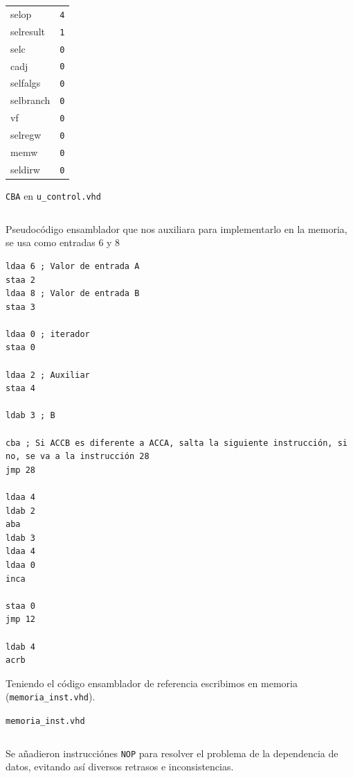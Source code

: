 \documentclass{IEEEtran}
\newenvironment{code}{\captionsetup{type=listing}}{}
\begin{document}
\begin{itemize}
\begin{table}[htbp]
\begin{tabular}{ll}
selop & \texttt{4}\\
selresult & \texttt{1}\\
selc & \texttt{0}\\
cadj & \texttt{0}\\
selfalgs & \texttt{0}\\
selbranch & \texttt{0}\\
vf & \texttt{0}\\
selregw & \texttt{0}\\
memw & \texttt{0}\\
seldirw & \texttt{0}\\
\hline
\end{tabular}
\end{table}
\begin{code}
\caption{\texttt{CBA} en \texttt{u\_control.vhd}}
\inputminted[firstline=253, lastline=271]{vhdl}{../Risc/u_control.vhd}
\end{code}
\end{itemize}

\begin{code}
\caption{Pseudocódigo ensamblador que nos auxiliara para implementarlo en la memoria, se usa como entradas 6 y 8}
\begin{verbatim}
ldaa 6 ; Valor de entrada A
staa 2
ldaa 8 ; Valor de entrada B
staa 3

ldaa 0 ; iterador
staa 0

ldaa 2 ; Auxiliar
staa 4

ldab 3 ; B

cba ; Si ACCB es diferente a ACCA, salta la siguiente instrucción, si no, se va a la instrucción 28
jmp 28

ldaa 4
ldab 2
aba
ldab 3
ldaa 4
ldaa 0
inca

staa 0
jmp 12

ldab 4
acrb
\end{verbatim}
\end{code}

Teniendo el código ensamblador de referencia escribimos en memoria (\texttt{memoria\_inst.vhd}).
\begin{code}
\caption{\texttt{memoria\_inst.vhd}}
\inputminted{vhdl}{../Risc/memoria_inst.vhd}
\end{code}

Se añadieron instrucciónes \texttt{NOP} para resolver el problema de la dependencia de datos, evitando así diversos retrasos e inconsistencias.
\end{document}

